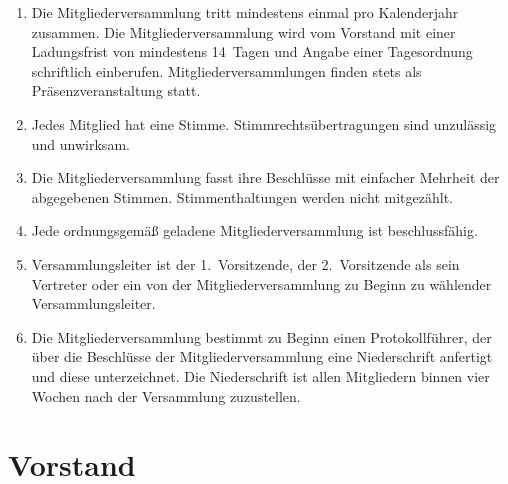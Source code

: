 \documentclass[a4paper, 10pt, headings=normal]{scrartcl}
\begin{document}
\begin{multicols}{2}
\begin{enumerate}[label={(\arabic*)}]
	\item
		Die Mitgliederversammlung tritt mindestens einmal pro Kalenderjahr zusammen.
		Die Mitgliederversammlung wird vom Vorstand mit einer Ladungsfrist von mindestens 14~Tagen und Angabe einer Tagesordnung schriftlich einberufen.
		Mitgliederversammlungen finden stets als Präsenzveranstaltung statt.
	\item
		Jedes Mitglied hat eine Stimme.
		Stimmrechtsübertragungen sind unzulässig und unwirksam.
	\item
		Die Mitgliederversammlung fasst ihre Beschlüsse mit einfacher Mehrheit der abgegebenen Stimmen.
		Stimmenthaltungen werden nicht mitgezählt.
	\item
		Jede ordnungsgemäß geladene Mitgliederversammlung ist beschlussfähig.
	\item
		Versammlungsleiter ist der 1.~Vorsitzende, der 2.~Vorsitzende als sein Vertreter oder ein von der Mitgliederversammlung zu Beginn zu wählender Versammlungsleiter.
	\item
		Die Mitgliederversammlung bestimmt zu Beginn einen Protokollführer, der über die Beschlüsse der Mitgliederversammlung eine Niederschrift anfertigt und diese unterzeichnet.
		Die Niederschrift ist allen Mitgliedern binnen vier Wochen nach der Versammlung zuzustellen.
\end{enumerate}

\section{Vorstand}
\label{par:vorstand}


\end{multicols}
\end{document}
